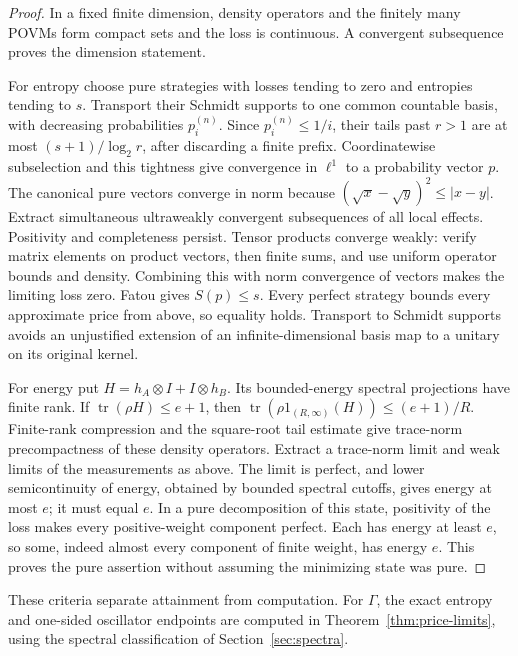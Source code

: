 \begin{proof}
In a fixed finite dimension, density operators and the finitely many POVMs form compact sets and the loss is continuous. A convergent subsequence proves the dimension statement.

For entropy choose pure strategies with losses tending to zero and entropies tending to $s$. Transport their Schmidt supports to one common countable basis, with decreasing probabilities $p_i^{(n)}$. Since $p_i^{(n)}\le1/i$, their tails past $r>1$ are at most $(s+1)/\log_2r$, after discarding a finite prefix. Coordinatewise subselection and this tightness give convergence in $\ell^1$ to a probability vector $p$. The canonical pure vectors converge in norm because $(\sqrt x-\sqrt y)^2\le|x-y|$. Extract simultaneous ultraweakly convergent subsequences of all local effects. Positivity and completeness persist. Tensor products converge weakly: verify matrix elements on product vectors, then finite sums, and use uniform operator bounds and density. Combining this with norm convergence of vectors makes the limiting loss zero. Fatou gives $S(p)\le s$. Every perfect strategy bounds every approximate price from above, so equality holds. Transport to Schmidt supports avoids an unjustified extension of an infinite-dimensional basis map to a unitary on its original kernel.

For energy put $H=h_A\otimes I+I\otimes h_B$. Its bounded-energy spectral projections have finite rank. If $\operatorname{tr}(\rho H)\le e+1$, then $\operatorname{tr}(\rho1_{(R,\infty)}(H))\le(e+1)/R$. Finite-rank compression and the square-root tail estimate give trace-norm precompactness of these density operators. Extract a trace-norm limit and weak limits of the measurements as above. The limit is perfect, and lower semicontinuity of energy, obtained by bounded spectral cutoffs, gives energy at most $e$; it must equal $e$. In a pure decomposition of this state, positivity of the loss makes every positive-weight component perfect. Each has energy at least $e$, so some, indeed almost every component of finite weight, has energy $e$. This proves the pure assertion without assuming the minimizing state was pure.
\end{proof}

These criteria separate attainment from computation. For $\Gamma$, the exact entropy and one-sided oscillator endpoints are computed in Theorem~\ref{thm:price-limits}, using the spectral classification of Section~\ref{sec:spectra}.

